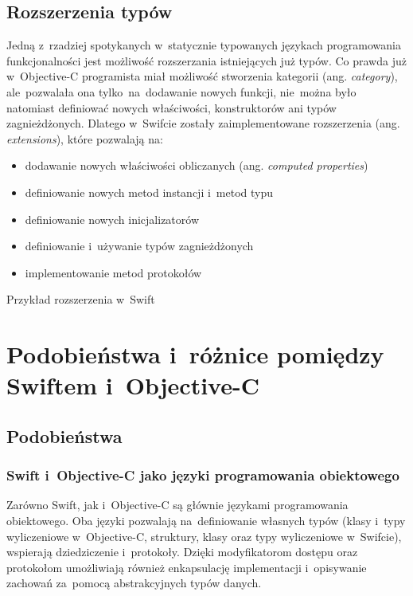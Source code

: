 \documentclass[mgr, shortabstract]{iithesis}
\newcommand{\ang}[1]{ang. \textit{#1}}
\newcommand{\swiftlisting}[2]{
    \swiftcode{src/#1.swift}
    \begin{listing}[ht]
      \caption{#2}
      \label{l:#1}
    \end{listing}
}
\begin{document}
\section{Rozszerzenia typów}
\label{s:rozszerzenia_typow}

Jedną z~rzadziej spotykanych w~statycznie typowanych językach programowania funkcjonalności jest możliwość rozszerzania istniejących już typów. Co prawda już w~Objective-C programista miał możliwość stworzenia kategorii (\ang{category}), ale~pozwalała ona tylko~na~dodawanie nowych funkcji, nie~można było natomiast definiować nowych właściwości, konstruktorów ani typów zagnieżdżonych. Dlatego w~Swifcie zostały zaimplementowane rozszerzenia (\ang{extensions}), które pozwalają na:

\begin{itemize}
    \item dodawanie nowych właściwości obliczanych (\ang{computed properties})
    \item definiowanie nowych metod instancji i~metod typu
    \item definiowanie nowych inicjalizatorów
    \item definiowanie i~używanie typów zagnieżdżonych
    \item implementowanie metod protokołów
\end{itemize}

\swiftlisting{2_extension}{Przykład rozszerzenia w~Swift}

\chapter{Podobieństwa i~różnice pomiędzy Swiftem i~Objective-C}
\label{ch:swift-objc}

\section{Podobieństwa}

\subsection{Swift i~Objective-C jako języki programowania obiektowego}

Zarówno Swift, jak i~Objective-C są głównie językami programowania  obiektowego. Oba języki pozwalają na~definiowanie własnych typów (klasy i~typy wyliczeniowe w~Objective-C, struktury, klasy oraz typy wyliczeniowe w~Swifcie), wspierają dziedziczenie i~protokoły. Dzięki modyfikatorom dostępu oraz protokołom umożliwiają również enkapsulację implementacji i~opisywanie zachowań za~pomocą abstrakcyjnych typów danych.
\end{document}
